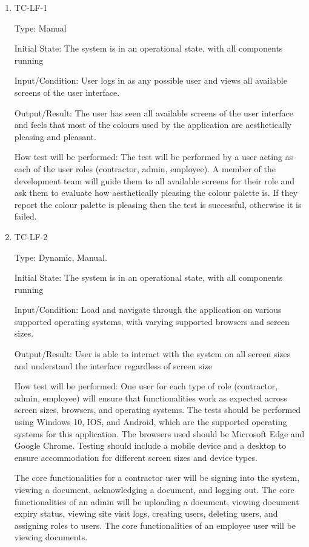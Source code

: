 \documentclass[12pt, titlepage]{article}
\begin{document}
\begin{enumerate}

  \item{TC-LF-1\\}

    Type: Manual

    Initial State: The system is in an operational state, with all
    components running

    Input/Condition: User logs in as any possible user and views all available screens of
    the user interface.

    Output/Result: The user has seen all available screens of the
    user interface and feels that most of the colours used by the
    application are aesthetically pleasing and pleasant.

    How test will be performed: The test will be performed by
    a user acting as each of the user roles (contractor, admin, employee). A member of the
    development team will guide them to all available screens for their role and
    ask them to evaluate how aesthetically pleasing the colour palette is.
    If they report the colour palette is pleasing then the test is successful, otherwise it is failed.

  \item{TC-LF-2\\}

    Type: Dynamic, Manual.

    Initial State: The system is in an operational state, with all
    components running

    Input/Condition: Load and navigate through the application on
    various supported operating systems, with varying supported
    browsers and screen sizes.

    Output/Result: User is able to interact with the system on all screen
    sizes and understand the interface regardless of screen size

    How test will be performed: One user for each type of role
    (contractor, admin, employee) will ensure that 
    functionalities work as expected across screen sizes, browsers,
    and operating systems. The tests should be performed using
    Windows 10, IOS, and Android, which are the supported operating
    systems for this application. The browsers used should be
    Microsoft Edge and Google Chrome. Testing should include a mobile
    device and a desktop to ensure accommodation for
    different screen sizes and device types.

    The core functionalities for a contractor user will be
    signing into the system, viewing a document, acknowledging a document,
    and logging out. The core functionalities of an admin will be
    uploading a document, viewing document expiry status, viewing site visit logs, creating users, deleting users,
     and assigning roles to users. The core
    functionalities of an employee user will be viewing documents.

\end{enumerate}
\end{document}
